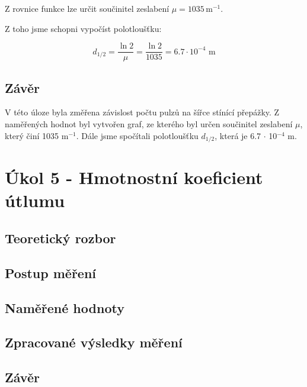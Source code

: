 \documentclass{protokol}
\begin{document}
    
    \begin{flushleft}
    Z rovnice funkce lze určit součinitel zeslabení $\mu = 1035 \, \text{m}^{-1}$.
    \end{flushleft}
    
    \begin{flushleft}
        Z toho jsme schopni vypočíst polotloušťku:
    \end{flushleft}

        \begin{equation}
        d_{1/2} =  \dfrac{\ln{2}}{\mu} = \dfrac{\ln{2}}{1035} = 6.7 \cdot 10^{-4} \text{ m}
        \end{equation}
    


    \subsection{Závěr}

    V této úloze byla změřena závislost počtu pulzů na šířce stínící přepážky. Z naměřených hodnot byl vytvořen graf, ze kterého byl určen součinitel zeslabení $\mu$, který činí 1035 m$^{-1}$. Dále jsme spočítali polotloušťku $d_{1/2}$, která je 6.7 $\cdot$ 10$^{-4}$ m.

\pagebreak

\section{Úkol 5 - Hmotnostní koeficient útlumu}
    \subsection{Teoretický rozbor}
    \subsection{Postup měření}
    \subsection{Naměřené hodnoty}   
    \subsection{Zpracované výsledky měření}
    \subsection{Závěr}
\end{document}
